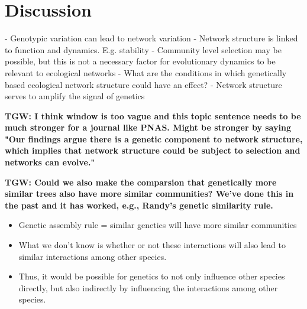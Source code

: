 \documentclass[9pt,twocolumn,twoside,lineno]{pnas-new}
\begin{document}
{%




}


\showmatmethods{} %


\section*{Discussion}


- Genotypic variation can lead to network variation
- Network structure is linked to function and dynamics. E.g. stability
- Community level selection may be possible, but this is not a
necessary factor for evolutionary dynamics to be relevant to ecological networks
- What are the conditions in which genetically based ecological network structure could have an effect?
- Network structure serves to amplify the signal of genetics


\textbf{TGW: I think window is too vague and this topic sentence needs
  to be much stronger for a journal like PNAS.  Might be stronger by
  saying "Our findings argue there is a genetic component to network
  structure, which implies that network structure could be subject to
  selection and networks can evolve."}

\textbf{TGW: Could we also make the comparsion that genetically more
  similar trees also have more similar communities?  We've done this
  in the past and it has worked, e.g., Randy's genetic similarity
  rule.}

\begin{itemize}
\item Genetic assembly rule = similar genetics will have more similar
  communities
\item What we don't know is whether or not these interactions will
  also lead to similar interactions among other species.
\item Thus, it would be possible for genetics to not only influence
  other species directly, but also indirectly by influencing the
  interactions among other species.
\end{itemize}
\end{document}

